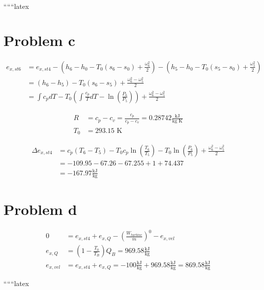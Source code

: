 ``````latex


\section*{Problem c}

\begin{align*}
e_{x,st6} &= e_{x,st4} - \left( h_6 - h_0 - T_0 (s_6 - s_0) + \frac{\omega_6^2}{2} \right) - \left( h_5 - h_0 - T_0 (s_5 - s_0) + \frac{\omega_5^2}{2} \right) \\
&= \left( h_6 - h_5 \right) - T_0 (s_6 - s_5) + \frac{\omega_6^2 - \omega_5^2}{2} \\
&= \int c_p dT - T_0 \left( \int \frac{c_p}{T} dT - \ln \left( \frac{P_6}{P_5} \right) \right) + \frac{\omega_6^2 - \omega_5^2}{2}
\end{align*}

\begin{align*}
R &= c_p - c_v = \frac{c_p}{c_p - c_v} = 0.28742 \frac{\text{kJ}}{\text{kg K}} \\
T_0 &= 293.15 \text{ K}
\end{align*}

\begin{align*}
\Delta e_{x,st4} &= c_p \left( T_6 - T_5 \right) - T_0 c_p \ln \left( \frac{T_6}{T_5} \right) - T_0 \ln \left( \frac{P_6}{P_5} \right) + \frac{\omega_6^2 - \omega_5^2}{2} \\
&= -109.95 - 67.26 - 67.255 + 1 + 74.437 \\
&= -167.97 \frac{\text{kJ}}{\text{kg}}
\end{align*}

\section*{Problem d}

\begin{align*}
0 &= e_{x,st4} + e_{x,Q} - \left( \frac{W_{turbine}}{\dot{m}} \right)^0 - e_{x,vel} \\
e_{x,Q} &= \left( 1 - \frac{T_0}{T_B} \right) Q_B = 969.58 \frac{\text{kJ}}{\text{kg}} \\
e_{x,vel} &= e_{x,st4} + e_{x,Q} = -100 \frac{\text{kJ}}{\text{kg}} + 969.58 \frac{\text{kJ}}{\text{kg}} = 869.58 \frac{\text{kJ}}{\text{kg}}
\end{align*}

``````latex


